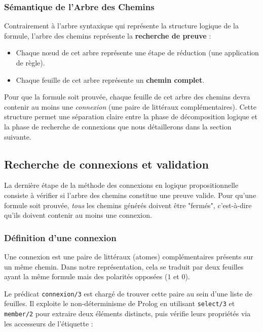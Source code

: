 \documentclass[12pt, a4paper]{article}
\begin{document}
\subsubsection{Sémantique de l'Arbre des Chemins}

Contrairement à l'arbre syntaxique qui représente la structure logique de la formule, l'arbre des chemins représente la \textbf{recherche de preuve} :
\begin{itemize}
    \item Chaque nœud de cet arbre représente une étape de réduction (une application de règle).
    \item Chaque feuille de cet arbre représente un \textbf{chemin complet}.
\end{itemize}

Pour que la formule soit prouvée, chaque feuille de cet arbre des chemins devra contenir au moins une \textit{connexion} (une paire de littéraux complémentaires). Cette structure permet une séparation claire entre la phase de décomposition logique et la phase de recherche de connexions que nous détaillerons dans la section suivante.

\subsection{Recherche de connexions et validation}

La dernière étape de la méthode des connexions en logique propositionnelle consiste à vérifier si l'arbre des chemins constitue une preuve valide. Pour qu'une formule soit prouvée, \textit{tous} les chemins générés doivent être "fermés", c'est-à-dire qu'ils doivent contenir au moins une connexion.

\subsubsection{Définition d'une connexion}

Une connexion est une paire de littéraux (atomes) complémentaires présents sur un même chemin. Dans notre représentation, cela se traduit par deux feuilles ayant la même formule mais des polarités opposées ($1$ et $0$). 

Le prédicat \texttt{connexion/3} est chargé de trouver cette paire au sein d'une liste de feuilles. Il exploite le non-déterminisme de Prolog en utilisant \texttt{select/3} et \texttt{member/2} pour extraire deux éléments distincts, puis vérifie leurs propriétés via les accesseurs de l'étiquette :
\end{document}
